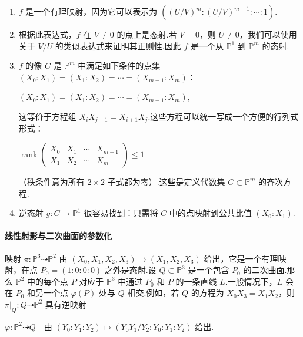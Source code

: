 \begin{enumerate}
    \item[\upshape (i)] \(f\) 是一个有理映射，因为它可以表示为 \(((U/V)^m : (U/V)^{m-1} : \cdots : 1)\).

    \item[\upshape (ii)] 根据此表达式，\(f\) 在 \(V \neq 0\) 的点上是态射.若 \(V=0\)，则 \(U \neq 0\)，我们可以使用关于 \(V/U\) 的类似表达式来证明其正则性.因此 \(f\) 是一个从 \({\mathbb{P}}^1\) 到 \({\mathbb{P}}^m\) 的态射.

    \item[\upshape (iii)] \(f\) 的像 \(C\) 是 \({\mathbb{P}}^m\) 中满足如下条件的点集 \((X_0 : X_1) = (X_1 : X_2) = \cdots = (X_{m-1} : X_m)\)：

\(
(X_0 : X_1) = (X_1 : X_2) = \cdots = (X_{m-1} : X_m),
\)

这等价于方程组 \(X_i X_{j+1} = X_{i+1} X_j\).这些方程可以统一写成一个方便的行列式形式：

\(
\operatorname{rank} \begin{pmatrix} X_0 & X_1 & \cdots & X_{m-1} \\ X_1 & X_2 & \cdots & X_m \end{pmatrix} \le 1
\)

（秩条件意为所有 \(2 \times 2\) 子式都为零）.这些是定义代数集 \(C \subset {\mathbb{P}}^m\) 的齐次方程.

    \item[\upshape (iv)] 逆态射 \(g : C \to {\mathbb{P}}^1\) 很容易找到：只需将 \(C\) 中的点映射到公共比值 \((X_0 : X_1)\).
\end{enumerate}

\paragraph{线性射影与二次曲面的参数化} 映射 \(\pi : {\mathbb{P}}^3 \dashrightarrow {\mathbb{P}}^2\) 由 \((X_0, X_1, X_2, X_3) \mapsto (X_1, X_2, X_3)\) 给出，它是一个有理映射，在点 \(P_0 = (1:0:0:0)\) 之外是态射.设 \(Q \subset {\mathbb{P}}^3\) 是一个包含 \(P_0\) 的二次曲面.那么 \({\mathbb{P}}^2\) 中的每个点 \(P\) 对应于 \({\mathbb{P}}^3\) 中通过 \(P_0\) 和 \(P\) 的一条直线 \(L\).一般情况下，\(L\) 会在 \(P_0\) 和另一个点 \(\varphi(P)\) 处与 \(Q\) 相交.例如，若 \(Q\) 的方程为 \(X_0X_3 = X_1X_2\)，则 \(\pi|_Q : Q \dashrightarrow {\mathbb{P}}^2\) 具有逆映射

\(
\varphi : {\mathbb{P}}^2 \dashrightarrow Q \quad \text{由 } (Y_0:Y_1:Y_2) \mapsto (Y_0Y_1/Y_2 : Y_0 : Y_1 : Y_2) \text{ 给出}.
\)

